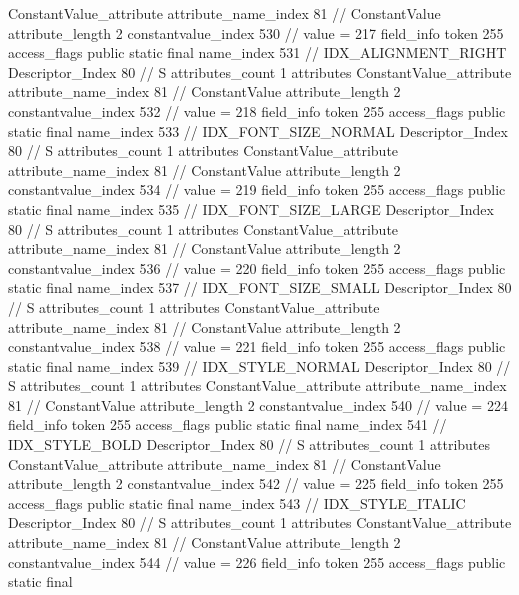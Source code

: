 {{{{{{				ConstantValue_attribute {
					attribute_name_index	81		// ConstantValue
					attribute_length	2
					constantvalue_index	530		// value = 217
				}
				}
			}
			field_info {
				token	255
				access_flags	public static final
				name_index	531		// IDX_ALIGNMENT_RIGHT
				Descriptor_Index	80		// S
				attributes_count	1
				attributes {
				ConstantValue_attribute {
					attribute_name_index	81		// ConstantValue
					attribute_length	2
					constantvalue_index	532		// value = 218
				}
				}
			}
			field_info {
				token	255
				access_flags	public static final
				name_index	533		// IDX_FONT_SIZE_NORMAL
				Descriptor_Index	80		// S
				attributes_count	1
				attributes {
				ConstantValue_attribute {
					attribute_name_index	81		// ConstantValue
					attribute_length	2
					constantvalue_index	534		// value = 219
				}
				}
			}
			field_info {
				token	255
				access_flags	public static final
				name_index	535		// IDX_FONT_SIZE_LARGE
				Descriptor_Index	80		// S
				attributes_count	1
				attributes {
				ConstantValue_attribute {
					attribute_name_index	81		// ConstantValue
					attribute_length	2
					constantvalue_index	536		// value = 220
				}
				}
			}
			field_info {
				token	255
				access_flags	public static final
				name_index	537		// IDX_FONT_SIZE_SMALL
				Descriptor_Index	80		// S
				attributes_count	1
				attributes {
				ConstantValue_attribute {
					attribute_name_index	81		// ConstantValue
					attribute_length	2
					constantvalue_index	538		// value = 221
				}
				}
			}
			field_info {
				token	255
				access_flags	public static final
				name_index	539		// IDX_STYLE_NORMAL
				Descriptor_Index	80		// S
				attributes_count	1
				attributes {
				ConstantValue_attribute {
					attribute_name_index	81		// ConstantValue
					attribute_length	2
					constantvalue_index	540		// value = 224
				}
				}
			}
			field_info {
				token	255
				access_flags	public static final
				name_index	541		// IDX_STYLE_BOLD
				Descriptor_Index	80		// S
				attributes_count	1
				attributes {
				ConstantValue_attribute {
					attribute_name_index	81		// ConstantValue
					attribute_length	2
					constantvalue_index	542		// value = 225
				}
				}
			}
			field_info {
				token	255
				access_flags	public static final
				name_index	543		// IDX_STYLE_ITALIC
				Descriptor_Index	80		// S
				attributes_count	1
				attributes {
				ConstantValue_attribute {
					attribute_name_index	81		// ConstantValue
					attribute_length	2
					constantvalue_index	544		// value = 226
				}
				}
			}
			field_info {
				token	255
				access_flags	public static final
}}}}}
